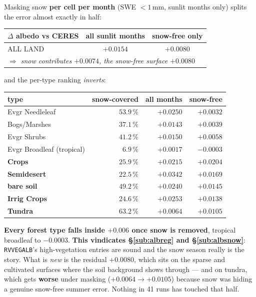 \documentclass[10pt]{article}
\begin{document}
Masking snow \textbf{per cell per month} (SWE $<1$\,mm, sunlit months only) splits the error
almost exactly in half:

\begin{center}\footnotesize
\begin{tabular}{l r r r r}
\toprule
$\Delta$ albedo vs CERES & \multicolumn{2}{c}{all sunlit months} & \multicolumn{2}{c}{snow-free only} \\
\midrule
ALL LAND & \multicolumn{2}{c}{$\mathbf{+0.0154}$} & \multicolumn{2}{c}{$\mathbf{+0.0080}$} \\
\multicolumn{5}{l}{\emph{$\Rightarrow$ snow contributes $+0.0074$, the snow-free surface $+0.0080$}} \\
\bottomrule
\end{tabular}
\end{center}

\noindent and the per-type ranking \emph{inverts}:

\begin{center}\footnotesize
\begin{tabular}{l r r r}
\toprule
type & snow-covered & all months & \textbf{snow-free} \\
\midrule
Evgr Needleleaf & $53.9\,\%$ & $+0.0250$ & $\mathbf{+0.0032}$ \\
Bogs/Marshes & $37.1\,\%$ & $+0.0143$ & $+0.0039$ \\
Evgr Shrubs & $41.2\,\%$ & $+0.0150$ & $+0.0058$ \\
Evgr Broadleaf (tropical) & $6.9\,\%$ & $+0.0017$ & $\mathbf{-0.0003}$ \\
\midrule
\textbf{Crops} & $25.9\,\%$ & $+0.0215$ & $\mathbf{+0.0204}$ \\
\textbf{Semidesert} & $22.5\,\%$ & $+0.0342$ & $\mathbf{+0.0169}$ \\
\textbf{bare soil} & $49.2\,\%$ & $+0.0240$ & $\mathbf{+0.0145}$ \\
\textbf{Irrig Crops} & $24.6\,\%$ & $+0.0253$ & $\mathbf{+0.0138}$ \\
\textbf{Tundra} & $63.2\,\%$ & $+0.0064$ & $\mathbf{+0.0105}$ \\
\bottomrule
\end{tabular}
\end{center}

\noindent \textbf{Every forest type falls inside $+0.006$ once snow is removed}, tropical
broadleaf to $-0.0003$. \textbf{This vindicates \S\ref{sub:albreg} and \S\ref{sub:albsnow}}:
\texttt{RVVEGALB}'s high-vegetation entries are sound and the snow season really is the story.
What is \emph{new} is the residual $+0.0080$, which sits on the sparse and cultivated surfaces
where the soil background shows through --- and on tundra, which gets \textbf{worse} under
masking ($+0.0064\to+0.0105$) because snow was hiding a genuine snow-free summer error.
Nothing in 41 runs has touched that half.
\end{document}
